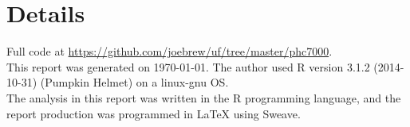 \documentclass[11pt]{article}
\begin{document}



\section*{Details}

Full code at \href{https://github.com/joebrew/uf/tree/master/phc7000}{https://github.com/joebrew/uf/tree/master/phc7000}. \\

This report was generated on \today.  The author used R version 3.1.2 (2014-10-31) (Pumpkin Helmet) on a linux-gnu OS.  \\

The analysis in this report was written in the R programming language, and the report production was programmed in \LaTeX{} using Sweave.\\
\end{document}
